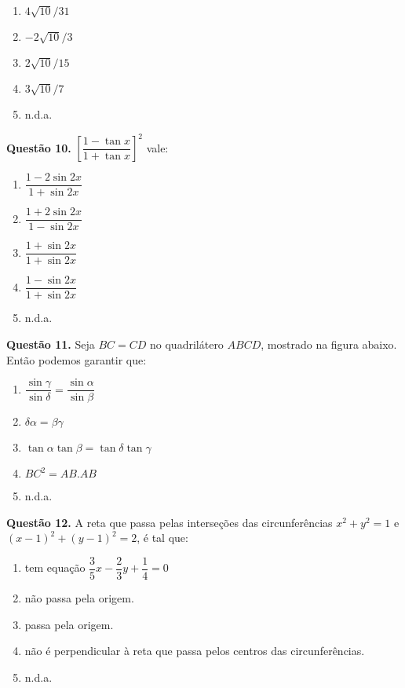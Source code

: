 \documentclass[11pt]{article}
\begin{document}
\begin{multicols}{3}
    \begin{enumerate}[\bf A (\quad)]
        \item $4\sqrt{10}/31$
        \item $-2\sqrt{10}/3$
        \item $2\sqrt{10}/15$
        \item $3\sqrt{10}/7$
        \item n.d.a.
    \end{enumerate}
\end{multicols}

\textbf{Questão 10.} $\left[ \dfrac{1 - \tan x}{1 + \tan x} \right]^2$ vale:

\begin{multicols}{3}
    \begin{enumerate}[\bf A (\quad)]
        \item $\dfrac{1 - 2\sin 2x}{1 + \sin 2x}$
        \item $\dfrac{1 + 2\sin 2x}{1 - \sin 2x}$
        \item $\dfrac{1 + \sin 2x}{1 + \sin 2x}$
        \item $\dfrac{1 - \sin 2x}{1 + \sin 2x}$
        \item n.d.a.
    \end{enumerate}
\end{multicols}

\textbf{Questão 11.} Seja  $BC  =  CD$  no  quadrilátero  $ABCD$,  mostrado  na  figura abaixo. Então podemos garantir que: 


\begin{enumerate}[\bf A (\quad)]
    \item $\dfrac{\sin \gamma}{\sin \delta} = \dfrac{\sin \alpha}{\sin \beta}$
    \item $\delta \alpha = \beta \gamma$
    \item $\tan \alpha \tan \beta = \tan \delta \tan \gamma$
    \item $BC^2 = AB. AB$
    \item n.d.a.
\end{enumerate}


\textbf{Questão 12.} A reta que passa pelas interseções das circunferências $x^2 + y^2 = 1$ e $(x - 1)^2 + (y - 1)^2 = 2$, é tal que:

\begin{enumerate}[\bf A (\quad)]
    \item  tem equação $\dfrac{3}{5}x - \dfrac{2}{3}y + \dfrac{1}{4} = 0$
    \item não passa pela origem.
    \item passa pela origem. 
    \item não é perpendicular à reta que passa pelos centros das circunferências.
    \item n.d.a.
\end{enumerate}
\end{document}
